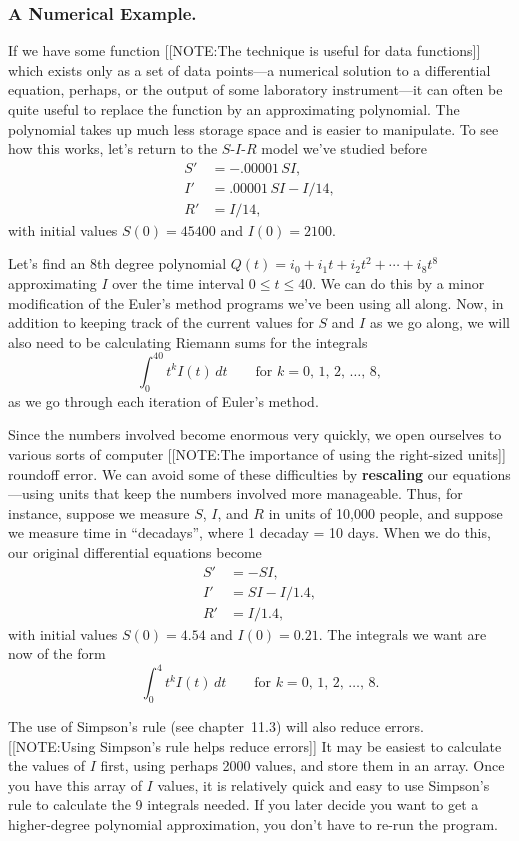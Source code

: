 \subsubsection{A Numerical Example.}
If we have some function 
[[NOTE:The technique is useful for data functions]]
which exists only as a set of data points---a numerical solution to a
differential equation, perhaps, or the output of some laboratory
instrument---it can often be quite useful to replace the function by
an approximating polynomial.  The polynomial takes up much less
storage space and is easier to manipulate.  To see how this works,
let's return to the $S$-$I$-$R$ model we've studied before
\begin{align*}
S'&= -.00001\, SI, \\
I'&= .00001\, SI -  I/14, \\
R'&= I/14,
\end{align*}
with initial values $S(0)=45400$ and $I(0)=2100$.

Let's find an 8th degree polynomial $Q(t)=i_0+i_1t+i_2t^2+\cdots
+i_8t^8$ approximating $I$ over the time interval $0\le t\le 40$.  We
can do this by a minor modification of the Euler's method programs
we've been using all along.  Now, in addition to keeping track of the
current values for $S$ and $I$ as we go along, we will also need to be
calculating Riemann sums for the integrals
\[
\int_0^{40} t^kI(t)\,dt \qquad \text{for $k =0$, 1, 2, \ldots , 8},
\]
as we go through each iteration of Euler's method.  

Since the numbers involved become enormous very quickly, we open
ourselves to various sorts of computer
[[NOTE:The importance  of using the  right-sized units]]
roundoff error.  We can avoid some of these difficulties by {\bf rescaling} our equations---using units that keep the numbers involved more manageable.  Thus, for instance, suppose we measure $S$, $I$, and $R$ in units of 10,000 people, and suppose we measure time in ``decadays'', where 1 decaday = 10 days.  When we do this, our original differential equations become
\begin{align*}
S'&= -SI, \\
I'&= SI -  I/1.4, \\
R'&= I/1.4,
\end{align*}
with initial values $S(0)=4.54$ and $I(0)=0.21$.  The integrals we
want are now of the form
\[
\int_0^{4} t^kI(t)\,dt \qquad \text{for $k = 0$, 1, 2, \ldots , 8}.
\]

The use of Simpson's rule (see chapter~11.3)
will also reduce errors.
[[NOTE:Using Simpson's rule helps reduce errors]]
It may be easiest to calculate the values of $I$ first, using perhaps
2000 values, and store them in an array.  Once you have this array of
$I$ values, it is relatively quick and easy to use Simpson's rule to
calculate the 9 integrals needed.  If you later decide you want to get
a higher-degree polynomial approximation, you don't have to re-run the
program.

